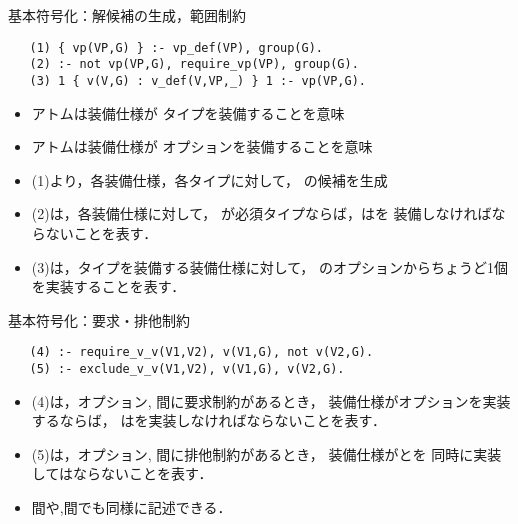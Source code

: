 \documentclass[dvipdfmx, 11pt]{beamer}
\begin{document}
\begin{frame}[fragile]{基本符号化：解候補の生成，範囲制約}
 \begin{exampleblock}{}
  \begin{lstlisting}
   (1) { vp(VP,G) } :- vp_def(VP), group(G). 
   (2) :- not vp(VP,G), require_vp(VP), group(G).
   (3) 1 { v(V,G) : v_def(V,VP,_) } 1 :- vp(VP,G).
  \end{lstlisting}
 \end{exampleblock}
 \begin{itemize}
  \item アトムは装備仕様が
   	タイプを装備することを意味
  \item アトムは装備仕様が
	オプションを装備することを意味
  \item (1)より，各装備仕様，各タイプに対して，
	の候補を生成
  \item (2)は，各装備仕様に対して，
	が必須タイプならば，はを
	装備しなければならないことを表す．
  \item (3)は，タイプを装備する装備仕様に対して，
	のオプションからちょうど1個を実装することを表す．
  \end{itemize}
\end{frame}
\begin{frame}[fragile]{基本符号化：要求・排他制約}
 \begin{exampleblock}{}
  \begin{lstlisting}
   (4) :- require_v_v(V1,V2), v(V1,G), not v(V2,G).
   (5) :- exclude_v_v(V1,V2), v(V1,G), v(V2,G).
  \end{lstlisting}
 \end{exampleblock}
 \begin{itemize}
  \item (4)は，オプション, 間に要求制約があるとき，
	装備仕様がオプションを実装するならば，
	はを実装しなければならないことを表す．
  \item (5)は，オプション, 間に排他制約があるとき，
	装備仕様がとを
	同時に実装してはならないことを表す．
  \item {}間や,間でも同様に記述できる．
 \end{itemize}
\end{frame}
\end{document}
